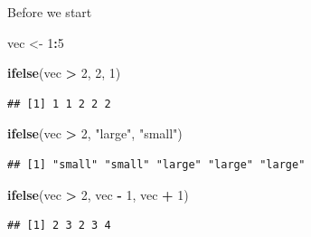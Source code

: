 \documentclass[ignorenonframetext,]{beamer}
\newenvironment{Shaded}{\begin{snugshade}}{\end{snugshade}}
\newcommand{\DecValTok}[1]{\textcolor[rgb]{0.00,0.00,0.81}{#1}}
\newcommand{\KeywordTok}[1]{\textcolor[rgb]{0.13,0.29,0.53}{\textbf{#1}}}
\newcommand{\NormalTok}[1]{#1}
\newcommand{\OperatorTok}[1]{\textcolor[rgb]{0.81,0.36,0.00}{\textbf{#1}}}
\newcommand{\StringTok}[1]{\textcolor[rgb]{0.31,0.60,0.02}{#1}}
\begin{document}
\begin{frame}[fragile]{Before we start}
\protect\hypertarget{before-we-start-1}{}

\begin{Shaded}
\begin{Highlighting}[]
\NormalTok{vec <-}\StringTok{ }\DecValTok{1}\OperatorTok{:}\DecValTok{5}
\end{Highlighting}
\end{Shaded}

\begin{Shaded}
\begin{Highlighting}[]
\KeywordTok{ifelse}\NormalTok{(vec }\OperatorTok{>}\StringTok{ }\DecValTok{2}\NormalTok{, }\DecValTok{2}\NormalTok{, }\DecValTok{1}\NormalTok{)}
\end{Highlighting}
\end{Shaded}

\begin{verbatim}
## [1] 1 1 2 2 2
\end{verbatim}

\begin{Shaded}
\begin{Highlighting}[]
\KeywordTok{ifelse}\NormalTok{(vec }\OperatorTok{>}\StringTok{ }\DecValTok{2}\NormalTok{, }\StringTok{"large"}\NormalTok{, }\StringTok{"small"}\NormalTok{)}
\end{Highlighting}
\end{Shaded}

\begin{verbatim}
## [1] "small" "small" "large" "large" "large"
\end{verbatim}

\begin{Shaded}
\begin{Highlighting}[]
\KeywordTok{ifelse}\NormalTok{(vec }\OperatorTok{>}\StringTok{ }\DecValTok{2}\NormalTok{, vec }\OperatorTok{-}\StringTok{ }\DecValTok{1}\NormalTok{, vec }\OperatorTok{+}\StringTok{ }\DecValTok{1}\NormalTok{)}
\end{Highlighting}
\end{Shaded}

\begin{verbatim}
## [1] 2 3 2 3 4
\end{verbatim}

\end{frame}
\end{document}
